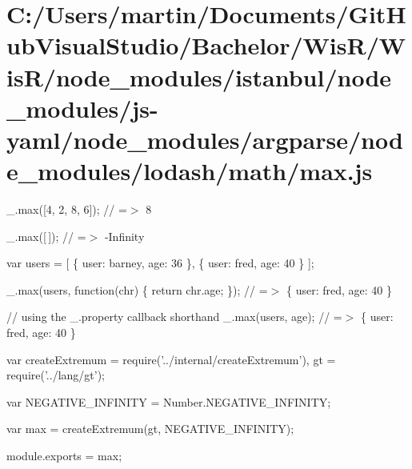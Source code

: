 \hypertarget{_c_1_2_users_2martin_2_documents_2_git_hub_visual_studio_2_bachelor_2_wis_r_2_wis_r_2node_module10fe477b364474bbb1da97cb7ca019d8}{}\section{C\+:/\+Users/martin/\+Documents/\+Git\+Hub\+Visual\+Studio/\+Bachelor/\+Wis\+R/\+Wis\+R/node\+\_\+modules/istanbul/node\+\_\+modules/js-\/yaml/node\+\_\+modules/argparse/node\+\_\+modules/lodash/math/max.\+js}
\+\_\+.\+max(\mbox{[}4, 2, 8, 6\mbox{]}); // =$>$ 8

\+\_\+.\+max(\mbox{[}$\,$\mbox{]}); // =$>$ -\/\+Infinity

var users = \mbox{[} \{ \textquotesingle{}user\textquotesingle{}\+: \textquotesingle{}barney\textquotesingle{}, \textquotesingle{}age\textquotesingle{}\+: 36 \}, \{ \textquotesingle{}user\textquotesingle{}\+: \textquotesingle{}fred\textquotesingle{}, \textquotesingle{}age\textquotesingle{}\+: 40 \} \mbox{]};

\+\_\+.\+max(users, function(chr) \{ return chr.\+age; \}); // =$>$ \{ \textquotesingle{}user\textquotesingle{}\+: \textquotesingle{}fred\textquotesingle{}, \textquotesingle{}age\textquotesingle{}\+: 40 \}

// using the {\ttfamily \+\_\+.\+property} callback shorthand \+\_\+.\+max(users, \textquotesingle{}age\textquotesingle{}); // =$>$ \{ \textquotesingle{}user\textquotesingle{}\+: \textquotesingle{}fred\textquotesingle{}, \textquotesingle{}age\textquotesingle{}\+: 40 \}


\begin{DoxyCodeInclude}
var createExtremum = require(\textcolor{stringliteral}{'../internal/createExtremum'}),
    gt = require(\textcolor{stringliteral}{'../lang/gt'});

var NEGATIVE\_INFINITY = Number.NEGATIVE\_INFINITY;

var max = createExtremum(gt, NEGATIVE\_INFINITY);

module.exports = max;
\end{DoxyCodeInclude}
 